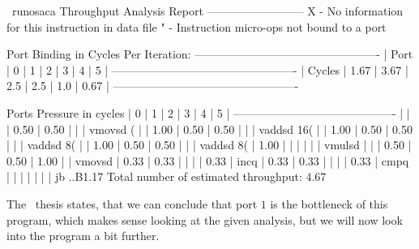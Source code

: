 \begin{LabeledExample}{\osaca\ run}{osaca}
    Throughput Analysis Report
    --------------------------
    X - No information for this instruction in data file
    " - Instruction micro-ops not bound to a port
    
    Port Binding in Cycles Per Iteration:
    -------------------------------------------------
    | Port   |   0  |   1  |  2  |  3  |  4  |   5  |
    -------------------------------------------------
    | Cycles | 1.67 | 3.67 | 2.5 | 2.5 | 1.0 | 0.67 |
    -------------------------------------------------
    
    Ports Pressure in cycles
    |   0  |   1  |   2  |   3  |   4  |   5  |
    -------------------------------------------
    |      |      | 0.50 | 0.50 |      |      | vmovsd  (%
    |      | 1.00 | 0.50 | 0.50 |      |      | vaddsd  16(%
    |      | 1.00 | 0.50 | 0.50 |      |      | vaddsd  8(%
    |      | 1.00 | 0.50 | 0.50 |      |      | vaddsd  8(%
    | 1.00 |      |      |      |      |      | vmulsd  %
    |      |      | 0.50 | 0.50 | 1.00 |      | vmovsd  %
    | 0.33 | 0.33 |      |      |      | 0.33 | incq    %
    | 0.33 | 0.33 |      |      |      | 0.33 | cmpq    %
    |      |      |      |      |      |      | jb      ..B1.17
    Total number of estimated throughput: 4.67
\end{LabeledExample}

The \osaca\ thesis states, that we can conclude that port $1$ is the bottleneck of this program, which makes sense looking at the given analysis, but we will now look into the program a bit further.


